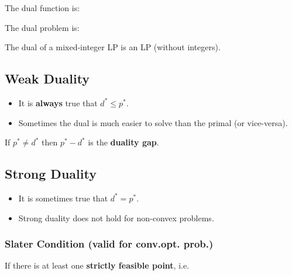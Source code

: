 \documentclass[8pt,a4paper]{scrartcl}
\begin{document}
\begin{multicols*}{3}
\begin{multicols*}{4}
{

The dual function is:


The dual problem is:


The dual of a mixed-integer LP is an LP (without integers).
}%

\subsection{Weak Duality}

\begin{itemize}

\item It is \textbf{always} true that $d^\ast\leq p^\ast$.
\item Sometimes the dual is much easier to solve than the primal (or vice-versa).
\end{itemize}

If $p^\ast\neq d^\ast$ then $p^\ast - d^\ast$ is the \textbf{duality gap}.

\subsection{Strong Duality}

\begin{itemize}

\item It is sometimes true that $d^\ast = p^\ast$.
\item Strong duality does not hold for non-convex problems.
\end{itemize}

\subsubsection{Slater Condition (valid for conv.opt. prob.)}

If there is at least one \textbf{strictly feasible point}, i.e.



\end{multicols*}
\end{multicols*}
\end{document}
